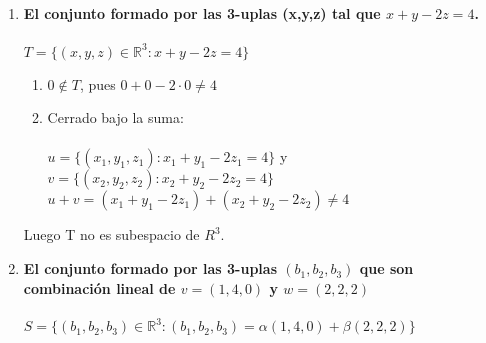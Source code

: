 \documentclass{article}
\begin{document}
\begin{enumerate}[1.]
\item \textbf{El conjunto formado por las 3-uplas (x,y,z) tal que $x+y-2z = 4$.} \\ \\
$T = \lbrace (x,y,z) \in \mathbb{R}^3 : x+y-2z = 4\rbrace$ \\ 

\begin{enumerate}[(1)]
\item $0 \not \in T$, pues $0+0-2 \cdot 0 \not = 4$
\item
	Cerrado bajo la suma: \\ \\
	$u = \lbrace (x_1,y_1,z_1) : x_1+y_1-2z_1 = 4 \rbrace $ y $v = \lbrace (x_2,y_2,z_2) : x_2+y_2-2z_2 = 4\rbrace$ \\
	$u+v = (x_1+y_1-2z_1) + (x_2+y_2-2z_2) \not = 4$
\end{enumerate}
Luego T no es subespacio de $R^3$.

\item \textbf{El conjunto formado por las 3-uplas $(b_1,b_2,b_3)$ que son combinación lineal de $v=(1,4,0)$ y $w=(2,2,2)$} \\ \\

$S = \lbrace (b_1,b_2,b_3) \in \mathbb{R}^3: (b_1,b_2,b_3) = \alpha(1,4,0) + \beta(2,2,2) \rbrace$


\end{enumerate}
\end{document}
